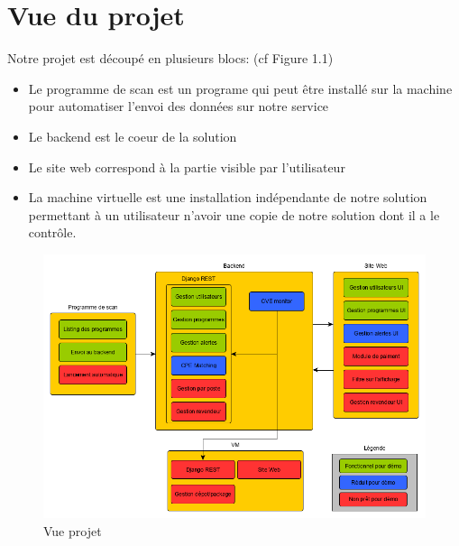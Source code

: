 \section{Vue du projet}
Notre projet est découpé en plusieurs blocs: (cf Figure 1.1)\\
\begin{itemize}
\item Le programme de scan est un programe qui peut être installé sur la machine pour automatiser l'envoi des données sur notre service
\item Le backend est le coeur de la solution
\item Le site web correspond à la partie visible par l’utilisateur
\item La machine virtuelle est une installation indépendante de notre solution permettant à un utilisateur n’avoir une copie de notre solution dont il a le contrôle.
\end{itemize}

\begin{figure}[H]
  \centering
  \includegraphics[width=14cm]{block_diagram.png}
  \vspace*{0.5cm}
  \caption{Vue projet}
  \vspace*{1cm}
\end{figure}

